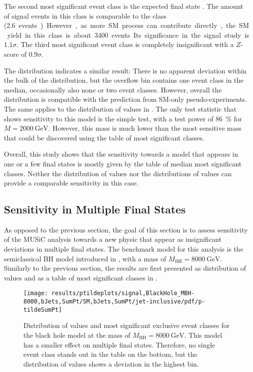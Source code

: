 The second most significant event class is the expected final state . The amount of signal events in this class is comparable to the  class (\SI{2.6} events). However, as more \ac{SM} process can contribute directly, the \ac{SM} yield in this class is about \num{3400} events. Its significance in the signal study is $\num{1.1}\sigma$. 
The third most significant event class is completely insignificant with a $Z$-score of $\num{0.9}\sigma$.

The \ptilde distribution indicates a similar result: There is no apparent deviation within the bulk of the distribution, but the overflow bin contains one event class in the median, occasionally also none or two event classes. However, overall the distribution is compatible with the prediction from \ac{SM}-only pseudo-experiments.
The same applies to the distribution of \TSphat values in . The only test statistic that shows sensitivity to this model is the simple test, with a test power of \SI{86}{\percent} for $M = \SI{2000}{\GeV}$. However, this mass is much lower than the most sensitive mass that could be discovered using the table of most significant classes.

Overall, this study shows that the sensitivity towards a model that appears in one or a few final states is mostly given by the table of median most significant classes. Neither the distribution of \ptilde values nor the distributions of \TSphat values can provide a comparable sensitivity in this case.

\subsection{Sensitivity in Multiple Final States}
As opposed to the previous section, the goal of this section is to assess sensitivity of the \ac{MUSiC} analysis towards a new physic that appear as insignificant deviations in multiple final states. The benchmark model for this analysis is the semiclassical \acl{BH} model introduced in , with a mass of $M_\text{BH} = \SI{8000}{\GeV}$.
Similarly to the previous section, the results are first presented as distribution of \ptilde values and as a table of most significant classes in .

\begin{figure}
    \centering
    \texttt{[image: results/ptildeplots/signal,BlackHole\_MBH-8000,bJets,SumPt/SM,bJets,SumPt/jet-inclusive/pdf/p-tildeSumPt]}
    {
        
    }
    \caption{Distribution of \ptilde values and most significant exclusive event classes for the black hole model at the mass of $M_\text{BH} = \SI{8000}{\GeV}$. This model has a smaller effect on multiple final states. Therefore, no single event class stands out in the table on the bottom, but the distribution of \ptilde values shows a deviation in the highest bin.}
    \label{fig:multiple_final_states}
\end{figure}

